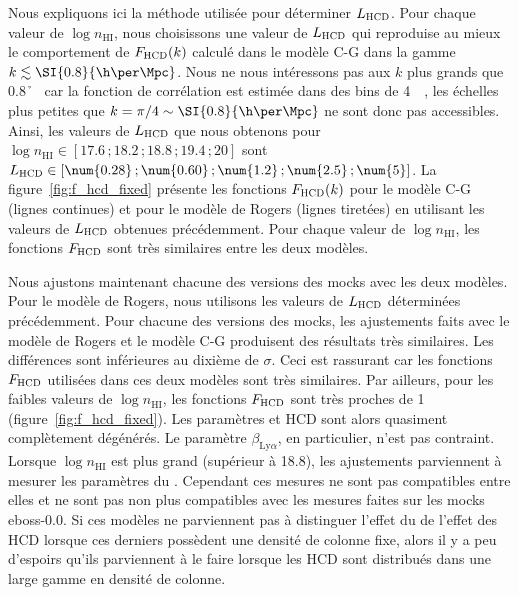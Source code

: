 Nous expliquons ici la méthode utilisée pour déterminer $L_{\textsc{HCD}}$.
Pour chaque valeur de $\log n_{\mathrm{HI}}$, nous choisissons une valeur de $L_{\textsc{HCD}}$ qui reproduise au mieux le comportement de $F_{\textsc{HCD}}(k)$ calculé dans le modèle C-G dans la gamme $k \lesssim \SI{0.8}{\h\per\Mpc}$. %
Nous ne nous intéressons pas aux $k$ plus grands que \SI{0.8}{\h\per\Mpc} car la fonction de corrélation est estimée dans des bins de \SI{4}{\perh\Mpc}, les échelles plus petites que $k = \pi / 4 \sim \SI{0.8}{\h\per\Mpc}$ ne sont donc pas accessibles.
Ainsi, les valeurs de $L_{\textsc{HCD}}$ que nous obtenons pour $\log n_{\mathrm{HI}} \in [\num{17.6}\,;\num{18.2}\,;\num{18.8}\,;\num{19.4}\,;\num{20}]$ sont $L_{\textsc{HCD}} \in [\num{0.28}\,; \num{0.60}\,; \num{1.2}\,; \num{2.5}\,; \num{5}]$.
La figure~\ref{fig:f_hcd_fixed} présente les fonctions $F_{\textsc{HCD}}(k)$ pour le modèle C-G (lignes continues) et pour le modèle de Rogers (lignes tiretées) en utilisant les valeurs de $L_{\textsc{HCD}}$ obtenues précédemment.
Pour chaque valeur de $\log n_{\mathrm{HI}}$, les fonctions $F_{\textsc{HCD}}$ sont très similaires entre les deux modèles.

Nous ajustons maintenant chacune des versions des mocks avec les deux modèles. Pour le modèle de Rogers, nous utilisons les valeurs de $L_{\textsc{HCD}}$ déterminées précédemment.
Pour chacune des versions des mocks, les ajustements faits avec le modèle de Rogers et le modèle C-G produisent des résultats très similaires. Les différences sont inférieures au dixième de $\sigma$.
Ceci est rassurant car les fonctions $F_{\textsc{HCD}}$ utilisées dans ces deux modèles sont très similaires.
Par ailleurs, pour les faibles valeurs de $\log n_{\mathrm{HI}}$, les fonctions $F_{\textsc{HCD}}$ sont très proches de 1 (figure~\ref{fig:f_hcd_fixed}). Les paramètres \lya{} et HCD sont alors quasiment complètement dégénérés. Le paramètre $\beta_{\mathrm{Ly}\alpha}$, en particulier, n'est pas contraint.  Lorsque $\log n_{\mathrm{HI}}$ est plus grand (supérieur à \num{18.8}), les ajustements parviennent à mesurer les paramètres du \lya{}.
Cependant ces mesures ne sont pas compatibles entre elles et ne sont pas non plus compatibles avec les mesures faites sur les mocks eboss-0.0.
Si ces modèles ne parviennent pas à distinguer l'effet du \lya{} de l'effet des HCD lorsque ces derniers possèdent une densité de colonne fixe, alors il y a peu d'espoirs qu'ils parviennent à le faire lorsque les HCD sont distribués dans une large gamme en densité de colonne.

